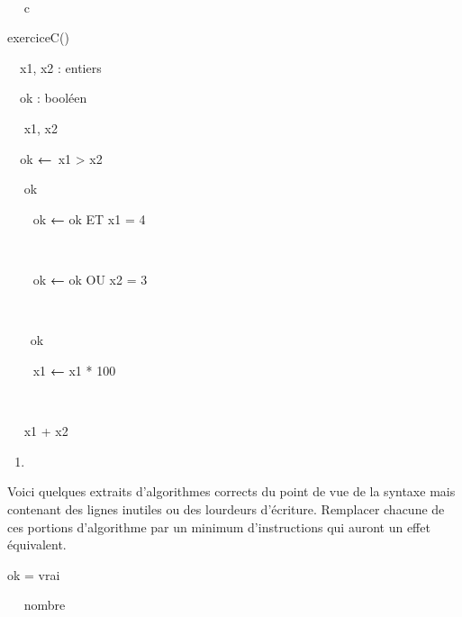 {\sffamily
\ \ }

{\sffamily
\ \  c}

{\sffamily
{} }


\bigskip

{\sffamily
{} exerciceC()}

{\sffamily
\ \ x1, x2 : entiers}

{\sffamily
\ \ ok : booléen}

{\sffamily
\ \  x1, x2}

{\sffamily
\texttt{\ \ }ok {\textbf{←}}\texttt{ }x1
{\textgreater} x2}

{\sffamily
\ \  ok }

{\sffamily
\texttt{\ \ \ \ }ok {\textbf{←}} ok ET x1 = 4}

{\sffamily
\ \ }

{\sffamily
\texttt{\ \ \ \ }ok {\textbf{←}} ok OU x2 = 3}

{\sffamily
\ \ }

{\sffamily
\ \ \  ok }

{\sffamily
\texttt{\ \ \ \ }x1 {\textbf{←}} x1 * 100}

{\sffamily
\ \ }

{\sffamily
\ \  x1 + x2}

{\sffamily
{} }

\liststyleExercice
\setcounter{saveenum}{\value{enumi}}
\begin{enumerate}
\setcounter{enumi}{\value{saveenum}}
\item {\sffamily\bfseries
{}}
\end{enumerate}
{
Voici quelques extraits d’algorithmes corrects du point de vue de la
syntaxe mais contenant des lignes inutiles ou des lourdeurs d’écriture.
Remplacer chacune de ces portions d’algorithme par un minimum
d’instructions qui auront un effet équivalent.}

{\sffamily
{} ok = vrai }

{\sffamily
\ \  nombre}

{\sffamily
{}}


\bigskip

